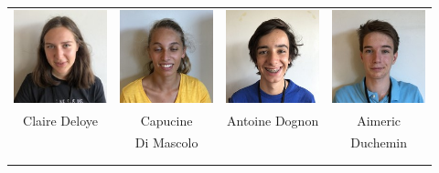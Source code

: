 \begin{center}
\begin{tabular}{cccc}
\includegraphics[angle=270,origin=c, width=27mm]{eleves/Deloye Claire.JPG} &
\includegraphics[angle=270,origin=c, width=27mm]{eleves/Di Mascolo Capucine.JPG} &
\includegraphics[angle=270,origin=c, width=27mm]{eleves/Dognon Antoine.JPG} &
\includegraphics[angle=270,origin=c, width=27mm]{eleves/Duchemin Aimeric.JPG} \\
Claire Deloye & Capucine & Antoine Dognon & Aimeric \\ & Di Mascolo & & Duchemin \\ \\ \\ 


\end{tabular}
\end{center}
